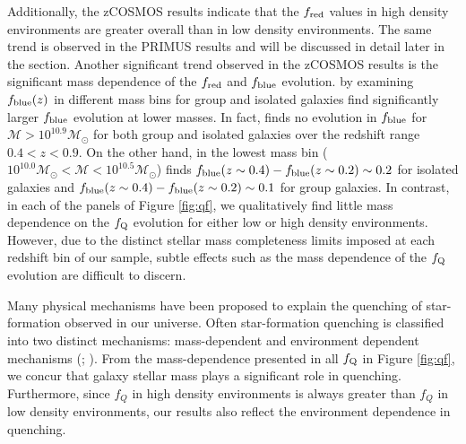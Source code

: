 \documentclass{emulateapj}
\begin{document}
Additionally, the zCOSMOS results indicate that the $f_{\rm{red}}$ values in high density environments are greater overall than in low density environments. The same trend is observed in the PRIMUS results and will be discussed in detail later in the section. Another significant trend observed in the zCOSMOS results is the significant mass dependence of the $f_{\rm{red}}$ and $f_{\rm{blue}}$ evolution. \cite{Iovino:2010aa} by examining $f_{\rm{blue}}(z)$ in different mass bins for group and isolated galaxies find significantly larger $f_{\rm{blue}}$ evolution at lower masses. In fact, \cite{Iovino:2010aa} finds no evolution in $f_{\rm{blue}}$ for $\mathcal{M} > 10^{10.9} \mathcal{M}_{\odot}$ for both group and isolated galaxies over the redshift range $0.4 < z < 0.9$. On the other hand, in the lowest mass bin ($10^{10.0} \mathcal{M}_{\odot} < \mathcal{M} < 10^{10.5} \mathcal{M}_{\odot}$) \cite{Iovino:2010aa} finds $f_{\rm{blue}}(z \sim 0.4) - f_{\rm{blue}}(z \sim 0.2) \sim 0.2$ for isolated galaxies and  $f_{\rm{blue}}(z \sim 0.4) - f_{\rm{blue}}(z \sim 0.2) \sim 0.1$ for group galaxies. In contrast, in each of the panels of Figure \ref{fig:qf}, we qualitatively find little mass dependence on the $f_{\rm{Q}}$ evolution for either low or high density environments. However, due to the distinct stellar mass completeness limits imposed at each redshift bin of our sample, subtle effects such as the mass dependence of the $f_{\rm{Q}}$ evolution are difficult to discern. 

Many physical mechanisms have been proposed to explain the quenching of star-formation observed in our universe. Often star-formation quenching is classified into two distinct mechanisms: mass-dependent and environment dependent mechanisms (\cite{Baldry:2006aa}; \cite{Peng:2010aa}). From the mass-dependence presented in all $f_{\rm{Q}}$ in Figure \ref{fig:qf}, we concur that galaxy stellar mass plays a significant role in quenching. Furthermore, since $f_Q$ in high density environments is always greater than $f_Q$ in low density environments, our results also reflect the environment dependence in quenching. %
\end{document}
